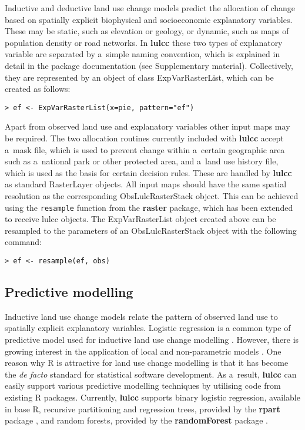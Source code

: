 \documentclass[gmdd, online, hvmath]{copernicus}
\begin{document}
Inductive and deductive land use change models predict the allocation of change based on spatially explicit biophysical and socioeconomic explanatory variables. These may be static, such as elevation or geology, or dynamic, such as maps of population density or road networks. In \textbf{lulcc} these two types of explanatory variable are separated by a~simple naming convention, which is explained in detail in the package documentation (see Supplementary material). Collectively, they are represented by an object of class ExpVarRasterList, which can be created as follows:
\begin{verbatim}
> ef <- ExpVarRasterList(x=pie, pattern="ef")
\end{verbatim}\hack{\noindent}Apart from observed land use and explanatory variables other input maps may be required. The two allocation routines currently included with \textbf{lulcc} accept a~mask file, which is used to prevent change within a~certain geographic area such as a~national park or other protected area, and a~land use history file, which is used as the basis for certain decision rules. These are handled by \textbf{lulcc} as standard RasterLayer objects. All input maps should have the same spatial resolution as the corresponding ObsLulcRasterStack object. This can be achieved using the \texttt{resample} function from the \textbf{raster} package, which has been extended to receive lulcc objects. The ExpVarRasterList object created above can be resampled to the parameters of an ObsLulcRasterStack object with the following command:
\begin{verbatim}
> ef <- resample(ef, obs)
\end{verbatim}

\subsection{Predictive modelling}

Inductive land use change models relate the pattern of observed land use to spatially explicit explanatory variables. Logistic regression is a common type of predictive model used for inductive land use change modelling \citep[e.g.][]{pontius2001,verburg2002}. However, there is growing interest in the application of local and non-parametric models \citep[e.g.][]{tayyebi2014}. One reason why R is attractive for land use change modelling is that it has become the \textit{de facto} standard for statistical software development. As a~result, \textbf{lulcc} can easily support various predictive modelling techniques by utilising code from existing R packages. Currently, \textbf{lulcc} supports binary logistic regression, available in base R, recursive partitioning and regression trees, provided by the \textbf{rpart} package \citep{therneau2014}, and random forests, provided by the \textbf{randomForest} package \citep{liaw2002}. \\
\end{document}
